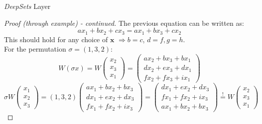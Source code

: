 \documentclass{beamer}
\begin{document}
\begin{frame}{\emph{DeepSets} Layer}
    \renewcommand{\qedsymbol}{} 
    \begin{proof}[Proof (through example) - continued]
        The previous equation can be written as:
        \[ax_1 + bx_2 + cx_3 = ax_1 + bx_3 + cx_2\]
        This should hold for any choice of $\mathbf{x}$ $\Rightarrow b = c$, $d=f, g=h$. \\
        For the permutation $\sigma = (1,3,2)$: 
        {\small
        \[W(\sigma x) = W \begin{pmatrix}
            x_2 \\
            x_3 \\
            x_1
        \end{pmatrix} = 
        \begin{pmatrix}
            ax_2 + bx_3 + bx_1 \\
            dx_2 + ex_3 + dx_1 \\
            fx_2 + fx_3 + ix_1
        \end{pmatrix}\]
        \[
        \sigma W \begin{pmatrix}
            x_1 \\
            x_2 \\
            x_3
        \end{pmatrix} = (1,3, 2) \begin{pmatrix}
            ax_1 + bx_2 + bx_3 \\
            dx_1 + ex_2 + dx_3 \\
            fx_1 + fx_2 + ix_3
        \end{pmatrix} = \begin{pmatrix}
            dx_1 + ex_2 + dx_3 \\
            fx_1 + fx_2 + ix_3 \\
            ax_1 + bx_2 + bx_3
        \end{pmatrix} \stackrel{!}{=} W \begin{pmatrix}
            x_2 \\
            x_3 \\
            x_1
        \end{pmatrix}
        \]
        }
    \end{proof}
    \renewcommand{\qedsymbol}{\ensuremath{\square}} 
\end{frame}
\end{document}
